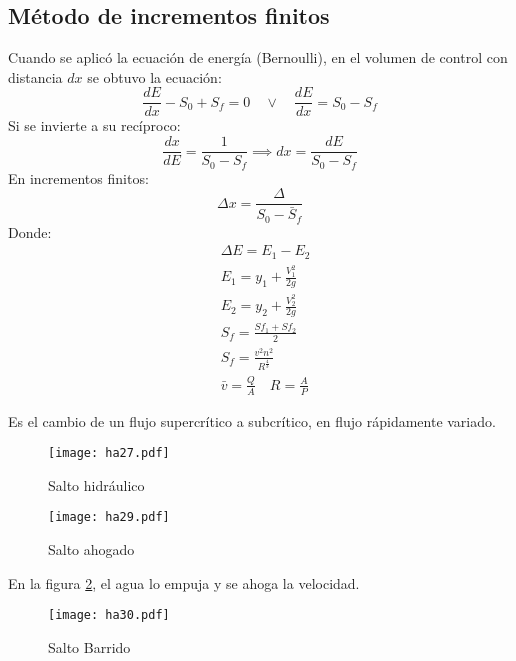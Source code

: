 \subsection{Método de incrementos finitos}
Cuando se aplicó la ecuación de energía (Bernoulli), en el volumen de control con distancia $dx$ se obtuvo la ecuación:
\begin{equation*}
    \frac{dE}{dx} - S_0 + S_f =0\quad \lor\quad \frac{dE}{dx} =S_0 - S_f
\end{equation*}
Si se invierte a su recíproco:
\begin{equation*}
    \frac{dx}{dE} = \frac{1}{S_0 - S_f}\implies dx = \frac{dE}{S_0 - S_f}
\end{equation*}
En incrementos finitos:
\begin{equation}
    \Delta x = \frac{\Delta}{S_0 -\bar{S}_f}
\end{equation}
Donde:
\begin{align*}
    &\Delta E = E_1 - E_2\\
    &E_1 = y_1 + \frac{V_1^2}{2g}\\
    &E_2 = y_2 + \frac{V_2^2}{2g}\\
    &S_f = \frac{Sf_1+ Sf_2}{2}\\
    &S_f = \frac{v^2n^2}{R^{\frac{4}{3}}}\\
    &\bar{v} = \frac{Q}{A}\quad R = \frac{A}{P}
\end{align*}

\begin{definition}
    Es el cambio de un flujo supercrítico a subcrítico, en flujo rápidamente variado.
\end{definition}

\begin{figure}[h!]
\centering
  \texttt{[image: ha27.pdf]}
  \caption{Salto hidráulico}
  \label{ha27}
\end{figure}

\begin{figure}[h!]
    \centering
      \texttt{[image: ha29.pdf]}
      \caption{Salto ahogado}
      \label{ha29}
\end{figure}
En la figura \ref{ha29}, el agua lo empuja y se ahoga la velocidad.

\begin{figure}[h!]
\centering
  \texttt{[image: ha30.pdf]}
  \caption{Salto Barrido}
  \label{ha30}
\end{figure}

